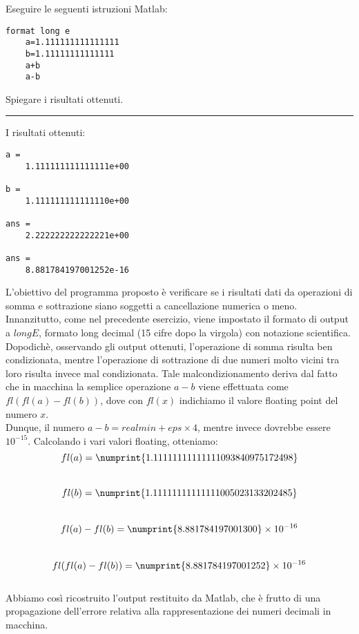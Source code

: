 Eseguire le seguenti istruzioni Matlab:
\begin{lstlisting}[caption = {}]
	format long e
	a=1.111111111111111
	b=1.11111111111111
	a+b
	a-b
\end{lstlisting}
Spiegare i risultati ottenuti.

\hspace{1cm}
\par\noindent\rule{\textwidth}{0.4pt}
\hspace{1cm}

I risultati ottenuti:
\begin{lstlisting}[caption = {}]
a =
	1.111111111111111e+00

b =
	1.111111111111110e+00

ans =
	2.222222222222221e+00

ans =
	8.881784197001252e-16

\end{lstlisting}

L'obiettivo del programma proposto è verificare se i risultati dati da operazioni di somma e sottrazione siano soggetti a cancellazione numerica o meno.\\

Innanzitutto, come nel precedente esercizio, viene impostato il formato di output a $longE$, formato long decimal (15 cifre dopo la virgola) con notazione scientifica.
Dopodichè, osservando gli output ottenuti, l'operazione di somma risulta ben condizionata, mentre l'operazione di sottrazione di due numeri 
molto vicini tra loro risulta invece mal condizionata.
Tale malcondizionamento deriva dal fatto che in macchina la semplice operazione $a-b$ viene effettuata come $fl(fl(a)-fl(b))$, dove con $fl(x)$ 
indichiamo il valore floating point del numero $x$.\\
Dunque, il numero $a-b = realmin + eps\times4$, mentre invece dovrebbe essere $10^{-15}$. Calcolando i vari valori floating, otteniamo:\\
$$fl(a) = \numprint{1.11111111111111093840975172498}$$\\
$$fl(b) = \numprint{1.11111111111111005023133202485}$$\\
$$fl(a) - fl(b) = \numprint{8.881784197001300}\times10^{-16}$$\\
$$fl(fl(a) - fl(b)) = \numprint{8.881784197001252}\times10^{-16}$$\\
Abbiamo così ricostruito l'output restituito da Matlab, che è frutto di una propagazione dell'errore relativa alla rappresentazione dei numeri decimali in macchina.
